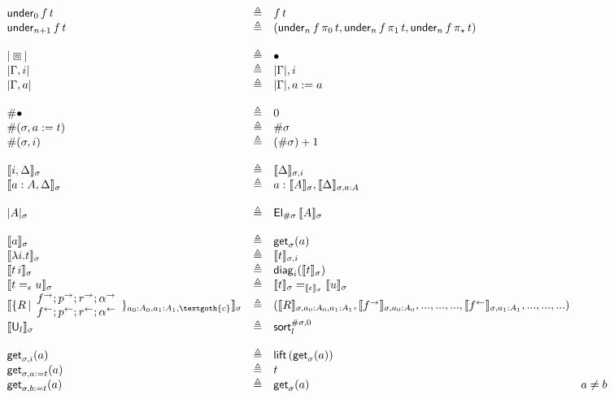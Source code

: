 \documentclass{article}
\newcommand{\emptyctx}{\boxbox}
\newcommand{\sort}[1]{\mathsf{U}_{#1}}
\newcommand{\defeq}{\triangleq}
\begin{document}
$$
\begin{array}{lcll}
\under{0}{f}{t} & \defeq & f\,t\\
\under{n+1}{f}{t} & \defeq & (\under{n}{f}{\pi_0\,t}, \under{n}{f}{\pi_1\,t}, \under{n}{f}{\pi_\star\,t})\\
\\
|\emptyctx|  & \defeq & \emptysigma\\
|\Gamma, i|  & \defeq & |\Gamma|, i\\
|\Gamma, a|  & \defeq & |\Gamma|, a:=a\\
\\
\# \emptysigma & \defeq & 0\\
\# (\sigma,a:=t) & \defeq & \#\sigma\\
\# (\sigma,i) & \defeq & (\#\sigma) + 1\\
\\
\semctx{\sigma}{i, \Delta} & \defeq &
  \semctx{\sigma, i}{\Delta} \\
\semctx{\sigma}{a:A, \Delta} & \defeq &
  a : \semnew{\sigma}{A}, \semctx{\sigma, a:A}{\Delta} \\
\\
\semtypenew{\sigma}{A} & \defeq & \elt{\#\sigma}{\semnew{\sigma}{A}}\\
\\
\semnew{\sigma}{a} & \defeq & \access{\sigma}{a}\\
\semnew{\sigma}{\lambda i.t} & \defeq & \semnew{\sigma,i}{t}\\
\semnew{\sigma}{t \, i} & \defeq & \diag{i}{\semnew{\sigma}{t}}\\
\semnew{\sigma}{t =_\epsilon u} & \defeq & \semnew{\sigma}{t} =_{\semnew{\sigma}{\epsilon}} \semnew{\sigma}{u}\\
\semnew{\sigma}{\mktuplenew{a_0:A_0}{a_1:A_1}{\textgoth{c}}{R}{\mktuplein{f^\rightarrow}{p^\rightarrow}{r^\rightarrow}{\alpha^\rightarrow}}{\mktuplein{f^\leftarrow}{p^\leftarrow}{r^\leftarrow}{\alpha^\leftarrow}}} & \defeq & (\semnew{\sigma,a_0:A_0,a_1:A_1}{R},\semnew{\sigma,a_0:A_0}{f^\rightarrow},...,...,...,\semnew{\sigma,a_1:A_1}{f^\leftarrow},...,...,...)\\
\semnew{\sigma}{\sort{l}} & \defeq & \semsort{l}^{\#\sigma,0}\\
\\
\access{\sigma, i}{a} & \defeq & \lift{(\access{\sigma}{a})} \\
\access{\sigma, a:=t}{a} & \defeq & t \\
\access{\sigma, b:=t}{a} & \defeq &
  \access{\sigma}{a} & a \neq b\\
\end{array}
$$
\end{document}
